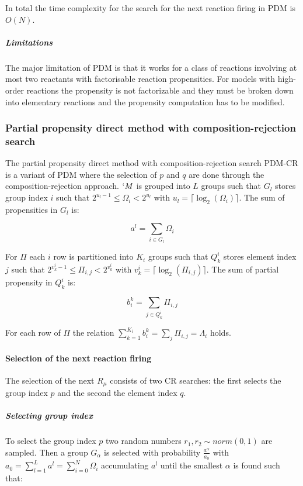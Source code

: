         In total the time complexity for the search for the next reaction firing in PDM is $O(N)$.

        \subparagraph{Limitations}
        The major limitation of PDM is that it works for a class of reactions involving at most two reactants with factorisable reaction propensities.
        For models with high-order reactions the propensity is not factorizable and they must be broken down into elementary reactions and the propensity computation has to be modified.

  \subsubsection{Partial propensity direct method with composition-rejection search}
  The partial propensity direct method with composition-rejection search PDM-CR is a variant of PDM where the selection of $p$ and $q$ are done through the composition-rejection approach.
  $`M$ is grouped into $L$ groups such that $G_l$ stores group index $i$ such that $2^{u_l-1}\le \Omega_i< 2^{u_l}$ with $u_l = \lceil\log_2(\Omega_i)\rceil$.
  The sum of propensities in $G_l$ is:

  $$a^l = \sum\limits_{i\in G_l}\Omega_i$$

  For $\Pi$ each $i$ row is partitioned into $K_i$ groups such that $Q_k^i$ stores element index $j$ such that $2^{v_k^i-1}\le\Pi_{i,j}<2^{v_k^i}$ with $v_k^i = \lceil\log_2(\Pi_{i,j})\rceil$.
  The sum of partial propensity in $Q_k^i$ is:

  $$b_i^k = \sum\limits_{j\in Q_k^i}\Pi_{i,j}$$

  For each row of $\Pi$ the relation $\sum\limits_{k=1}^{K_i}b_i^k = \sum\limits_{j}\Pi_{i,j} = \Lambda_i$ holds.

    \paragraph{Selection of the next reaction firing}
    The selection of the next $R_\mu$ consists of two CR searches: the first selects the group index $p$ and the second the element index $q$.

      \subparagraph{Selecting group index}
      To select the group index $p$ two random numbers $r_1,r_2\sim norm(0,1)$ are sampled.
      Then a group $G_\alpha$ is selected with probability $\frac{a^\alpha}{a_0}$ with $a_0 = \sum\limits_{l=1}^La^l = \sum\limits_{i=0}^N\Omega_i$ accumulating $a^l$ until the smallest $\alpha$ is found such that:

